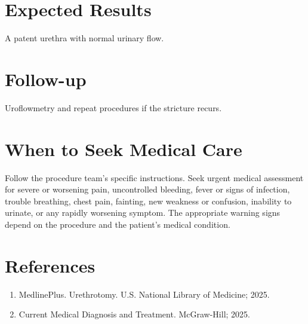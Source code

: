 \section*{Expected Results}
A patent urethra with normal urinary flow.

\section*{Follow-up}
Uroflowmetry and repeat procedures if the stricture recurs.

\section*{When to Seek Medical Care}
Follow the procedure team's specific instructions. Seek urgent medical assessment for severe or worsening pain, uncontrolled bleeding, fever or signs of infection, trouble breathing, chest pain, fainting, new weakness or confusion, inability to urinate, or any rapidly worsening symptom. The appropriate warning signs depend on the procedure and the patient's medical condition.

\section*{References}
\begin{enumerate}
  \item MedlinePlus. Urethrotomy. U.S. National Library of Medicine; 2025.
  \item Current Medical Diagnosis and Treatment. McGraw-Hill; 2025.
\end{enumerate}

\clearpage
